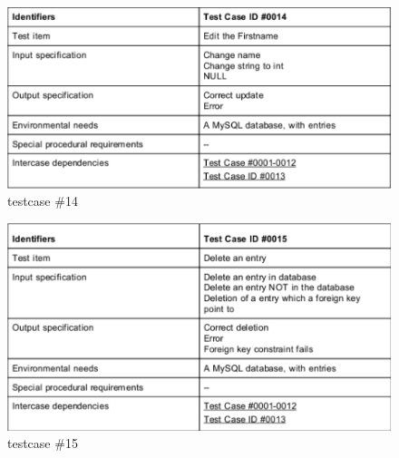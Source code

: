 \begin{figure}
 \includegraphics[scale=1]{images/dbtestcase0014}
  \caption{testcase \#14}
  \label{fig:dbcase14}
\end{figure}

\begin{figure}
 \includegraphics[scale=1]{images/dbtestcase0015}
  \caption{testcase \#15}
  \label{fig:dbcase15}
\end{figure}

